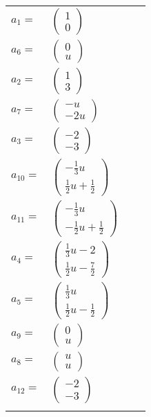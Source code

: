 \documentclass[1p]{elsarticle_modified}
\theoremstyle{definition}
\begin{document}
\begin{tabular}{m{7pt} m{180pt} m{7pt} m{180pt} }
\flushright $a_{1}=$&$\begin{pmatrix}1\\0\end{pmatrix}$ \\
\flushright $a_{6}=$&$\begin{pmatrix}0\\u\end{pmatrix}$ \\
\flushright $a_{2}=$&$\begin{pmatrix}1\\3\end{pmatrix}$ \\
\flushright $a_{7}=$&$\begin{pmatrix}- u\\-2 u\end{pmatrix}$ \\
\flushright $a_{3}=$&$\begin{pmatrix}-2\\-3\end{pmatrix}$ \\
\flushright $a_{10}=$&$\begin{pmatrix}-\frac{1}{3} u\\\frac{1}{2} u+\frac{1}{2}\end{pmatrix}$ \\
\flushright $a_{11}=$&$\begin{pmatrix}-\frac{1}{3} u\\-\frac{1}{2} u+\frac{1}{2}\end{pmatrix}$ \\
\flushright $a_{4}=$&$\begin{pmatrix}\frac{1}{3} u-2\\\frac{1}{2} u-\frac{7}{2}\end{pmatrix}$ \\
\flushright $a_{5}=$&$\begin{pmatrix}\frac{1}{3} u\\\frac{1}{2} u-\frac{1}{2}\end{pmatrix}$ \\
\flushright $a_{9}=$&$\begin{pmatrix}0\\u\end{pmatrix}$ \\
\flushright $a_{8}=$&$\begin{pmatrix}u\\u\end{pmatrix}$ \\
\flushright $a_{12}=$&$\begin{pmatrix}-2\\-3\end{pmatrix}$\\&\end{tabular}
\end{document}
